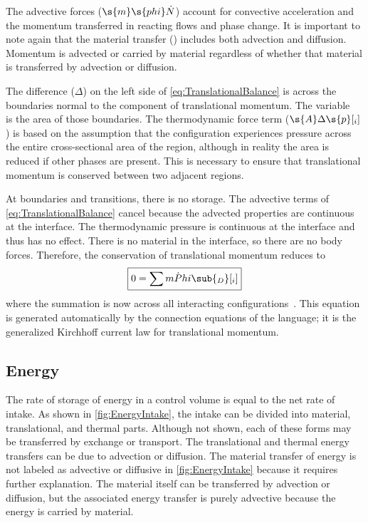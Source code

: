 The advective forces ($\s{m}\s{phi}\dot{N}$) account for convective acceleration and the momentum transferred in reacting flows and phase change.  It is important to note again that the material transfer () includes both advection and diffusion.  Momentum is advected or carried by material regardless of whether that material is transferred by advection or diffusion.

The difference ($\Delta$) on the left side of \autoref{eq:TranslationalBalance} is across the boundaries normal to the component of translational momentum.  The variable~ is the area of those boundaries.  The thermodynamic force term ($\s{A}\Delta\s{p}[_i]$) is based on the assumption that the configuration experiences pressure across the entire cross-sectional area of the region, although in reality the area is reduced if other phases are present.  This is necessary to ensure that translational momentum is conserved between two adjacent regions.


At boundaries and transitions, there is no storage.  The advective terms of \autoref{eq:TranslationalBalance} cancel because the advected properties are continuous at the interface.  The thermodynamic pressure is continuous at the interface and thus has no effect.  There is no material in the interface, so there are no body forces.  Therefore, the conservation of translational momentum reduces to
\begin{equation}
  \label{eq:TranslationalBalanceInterface}
  \boxed{0 = \sum\dot{mPhi}\sub{_D}[_i]}
\end{equation}
where the summation is now across all interacting configurations~.  This equation is generated automatically by the connection equations of the  language; it is the generalized Kirchhoff current law for translational momentum.


\subsection{Energy}
\label{sec:BasicEnergyBalance}


The rate of storage of energy in a control volume is equal to the net rate of intake.  As shown in \autoref{fig:EnergyIntake}, the intake can be divided into material, translational, and thermal parts.  Although not shown, each of these forms may be transferred by exchange or transport.  The translational and thermal energy transfers can be due to advection or diffusion.  The material transfer of energy is not labeled as advective or diffusive in \autoref{fig:EnergyIntake} because it requires further explanation.  The material itself can be transferred by advection or diffusion, but the associated energy transfer is purely advective because the energy is carried by material.

